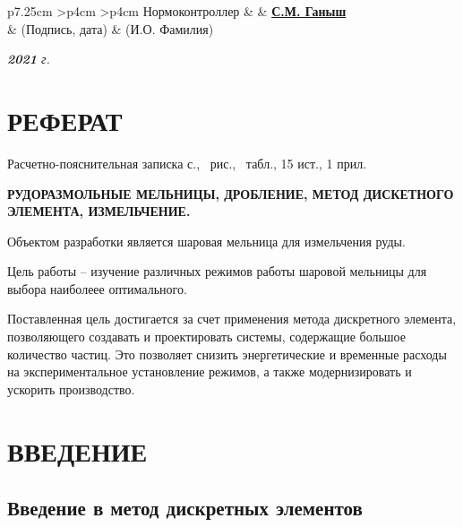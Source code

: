 \documentclass[utf8x, 14pt, oneside, a4paper]{article}
\newenvironment{signstabular}[1][1]{
	\renewcommand*{\arraystretch}{#1}
	\tabular
}{
	\endtabular
}
\begin{document}
\begin{titlepage}
\begin{table}[h!]
			\begin{signstabular}[0.7]{p{7.25cm} >{\centering\arraybackslash}p{4cm} >{\centering\arraybackslash}p{4cm}}
				Нормоконтроллер & \uline{\hspace*{4cm}} & \uline{\hfill \textbf{С.М. Ганыш} \hfill} \\
				& \scriptsize (Подпись, дата) & \scriptsize (И.О. Фамилия)
			\end{signstabular}
		\end{table}

		\vfill

		\begin{center}
			\normalsize \textit{\textbf{2021} г.}
		\end{center}
	\end{titlepage}
\pagebreak
	\normalsize
	\setcounter{page}{2}
	
		\section*{РЕФЕРАТ}
		\normalsize
			Расчетно-пояснительная записка \pageref{LastPage} с., \totalfigures\ рис., \totaltables\ табл., 15 ист., 1 прил.

			\textbf{РУДОРАЗМОЛЬНЫЕ МЕЛЬНИЦЫ, ДРОБЛЕНИЕ, МЕТОД ДИСКЕТНОГО ЭЛЕМЕНТА, ИЗМЕЛЬЧЕНИЕ.}

Объектом разработки является шаровая мельница для измельчения руды.

Цель работы -- изучение различных режимов работы шаровой мельницы для выбора наиболеее оптимального. 

Поставленная цель достигается за счет применения метода дискретного элемента, позволяющего создавать и проектировать системы, содержащие большое количество частиц.
Это позволяет снизить энергетические и временные расходы на экспериментальное установление режимов, а также модернизировать и ускорить производство.


		\pagebreak
	
	\renewcommand{\contentsname}{\normalsize\bfseries\centering СОДЕРЖАНИЕ}
	\small
	\tableofcontents
	\normalsize

		\pagebreak

	\section*{ВВЕДЕНИЕ}


\subsection*{Введение в метод дискретных элементов}
\end{document}
